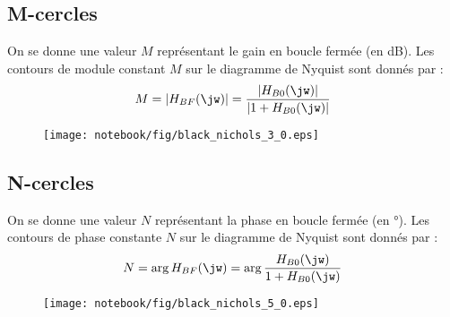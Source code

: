 \subsection{M-cercles}
On se donne une valeur $M$ représentant le gain en boucle fermée (en \si{\dB}). 
Les contours de module constant $M$ sur le diagramme de Nyquist 
sont donnés par :
\[
    M=|H_{BF}(\jw)|=\dfrac{|H_{B0}(\jw)|}{|1+H_{B0}(\jw)|}
\]
\begin{figure}[!h]
\begin{center}
    \texttt{[image: notebook/fig/black\_nichols\_3\_0.eps]}
\end{center}
    \caption{}
\end{figure}
\subsection{N-cercles}
On se donne une valeur $N$ représentant la phase en boucle fermée 
(en \si{\degree}). Les contours de phase constante $N$ sur le diagramme 
de Nyquist sont donnés par :
\[
    N=\arg{H_{BF}(\jw)}=\arg{\dfrac{H_{B0}(\jw)}{1+H_{B0}(\jw)}}
\]
\begin{figure}[!h]
    \begin{center}
        \texttt{[image: notebook/fig/black\_nichols\_5\_0.eps]}
    \end{center}
\end{figure}
\clearpage
